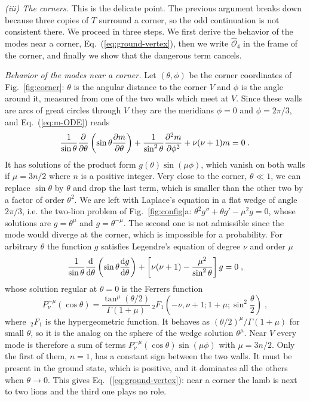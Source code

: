 \emph{(iii) The corners.} This is the delicate point. The previous argument breaks down because three copies of $T$ surround a corner, so the odd continuation is not consistent there. We proceed in three steps. We first derive the behavior of the modes near a corner, Eq.~(\ref{eq:ground-vertex}), then we write $\hat{\mathcal{O}}_4$ in the frame of the corner, and finally we show that the dangerous term cancels.

\emph{Behavior of the modes near a corner.} Let $(\theta, \phi)$ be the corner coordinates of Fig.~\ref{fig:corner}: $\theta$ is the angular distance to the corner $V$ and $\phi$ is the angle around it, measured from one of the two walls which meet at $V$. Since these walls are arcs of great circles through $V$ they are the meridians $\phi = 0$ and $\phi = 2\pi/3$, and Eq.~(\ref{eq:m-ODE}) reads
\begin{equation} \label{S:polar}
    \frac{1}{\sin \theta} \pdv{}{\theta} \left( \sin \theta \pdv{m}{\theta} \right) + \frac{1}{\sin^2 \theta} \pdv[2]{m}{\phi} + \nu (\nu + 1) m = 0 \;.
\end{equation}
It has solutions of the product form $g(\theta) \sin (\mu \phi)$, which vanish on both walls if $\mu = 3n/2$ where $n$ is a positive integer. Very close to the corner, $\theta \ll 1$, we can replace $\sin \theta$ by $\theta$ and drop the last term, which is smaller than the other two by a factor of order $\theta^2$. We are left with Laplace's equation in a flat wedge of angle $2\pi/3$, i.e. the two-lion problem of Fig.~\ref{fig:config}a: $\theta^2 g'' + \theta g' - \mu^2 g = 0$, whose solutions are $g = \theta^{\mu}$ and $g = \theta^{-\mu}$. The second one is not admissible since the mode would diverge at the corner, which is impossible for a probability. For arbitrary $\theta$ the function $g$ satisfies Legendre's equation of degree $\nu$ and order $\mu$
\begin{equation} \label{S:legendre}
    \frac{1}{\sin \theta} \dv{}{\theta} \left( \sin \theta \dv{g}{\theta} \right) + \left[ \nu (\nu + 1) - \frac{\mu^2}{\sin^2 \theta} \right] g = 0 \;,
\end{equation}
whose solution regular at $\theta = 0$ is the Ferrers function \cite{DLMF}
\begin{equation} \label{S:ferrers}
    P_\nu^{-\mu}(\cos \theta) = \frac{\tan^{\mu}(\theta/2)}{\Gamma(1 + \mu)} \,_2F_1\left( -\nu, \nu + 1 ; 1 + \mu ; \sin^2 \frac{\theta}{2} \right) \;,
\end{equation}
where $\,_2F_1$ is the hypergeometric function. It behaves as $(\theta/2)^{\mu}/\Gamma(1 + \mu)$ for small $\theta$, so it is the analog on the sphere of the wedge solution $\theta^{\mu}$. Near $V$ every mode is therefore a sum of terms $P_\nu^{-\mu}(\cos \theta) \sin (\mu \phi)$ with $\mu = 3n/2$. Only the first of them, $n = 1$, has a constant sign between the two walls. It must be present in the ground state, which is positive, and it dominates all the others when $\theta \to 0$. This gives Eq.~(\ref{eq:ground-vertex}): near a corner the lamb is next to two lions and the third one plays no role.

